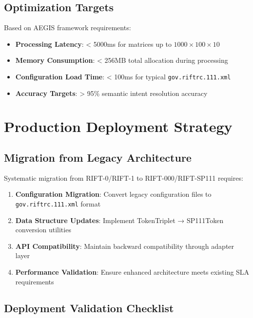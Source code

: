 \documentclass[11pt,a4paper]{article}
\theoremstyle{definition}
\theoremstyle{remark}
\begin{document}
\subsection{Optimization Targets}
\label{subsec:optimization}

Based on AEGIS framework requirements:

\begin{itemize}
\item \textbf{Processing Latency}: < 5000ms for matrices up to $1000 \times 100 \times 10$
\item \textbf{Memory Consumption}: < 256MB total allocation during processing
\item \textbf{Configuration Load Time}: < 100ms for typical \texttt{gov.riftrc.111.xml}
\item \textbf{Accuracy Targets}: > 95\% semantic intent resolution accuracy
\end{itemize}


\section{Production Deployment Strategy}
\label{sec:deployment}

\subsection{Migration from Legacy Architecture}
\label{subsec:migration}

Systematic migration from RIFT-0/RIFT-1 to RIFT-000/RIFT-SP111 requires:

\begin{enumerate}
\item \textbf{Configuration Migration}: Convert legacy configuration files to \texttt{gov.riftrc.111.xml} format
\item \textbf{Data Structure Updates}: Implement TokenTriplet → SP111Token conversion utilities  
\item \textbf{API Compatibility}: Maintain backward compatibility through adapter layer
\item \textbf{Performance Validation}: Ensure enhanced architecture meets existing SLA requirements
\end{enumerate}

\subsection{Deployment Validation Checklist}
\label{subsec:deployment-validation}
\end{document}

